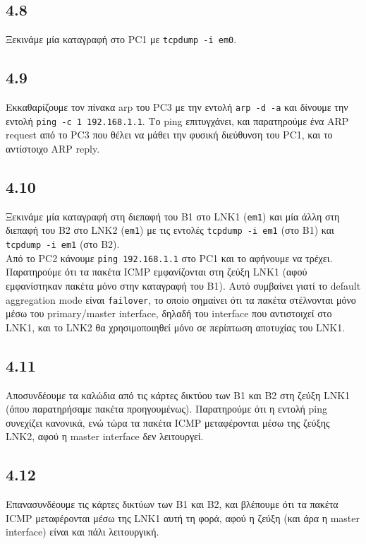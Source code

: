 \documentclass[a4paper, 12pt]{article}
\begin{document}
	\subsection*{4.8}
		Ξεκινάμε μία καταγραφή στο PC1 με \verb|tcpdump -i em0|.

	\subsection*{4.9}
		Εκκαθαρίζουμε τον πίνακα arp του PC3 με την εντολή \verb|arp -d -a| και δίνουμε την εντολή \verb|ping -c 1 192.168.1.1|. Το ping επιτυγχάνει, και παρατηρούμε ένα ARP request από το PC3 που θέλει να μάθει την φυσική διεύθυνση του PC1, και το αντίστοιχο ARP reply.

	\subsection*{4.10}
		Ξεκινάμε μία καταγραφή στη διεπαφή του B1 στο LNK1 (\verb|em1|) και μία άλλη στη διεπαφή του B2 στο LNK2 (\verb|em1|) με τις εντολές \verb|tcpdump -i em1| (στο B1) και \verb|tcpdump -i em1| (στο B2). \\
		
		Από το PC2 κάνουμε \verb|ping 192.168.1.1| στο PC1 και το αφήνουμε να τρέχει. Παρατηρούμε ότι τα πακέτα ICMP εμφανίζονται στη ζεύξη LNK1 (αφού εμφανίστηκαν πακέτα μόνο στην καταγραφή του B1). Αυτό συμβαίνει γιατί το default aggregation mode είναι \verb|failover|, το οποίο σημαίνει ότι τα πακέτα στέλνονται μόνο μέσω του primary/master interface, δηλαδή του interface που αντιστοιχεί στο LNK1, και το LNK2 θα χρησιμοποιηθεί μόνο σε περίπτωση αποτυχίας του LNK1.
		
	\subsection*{4.11}
		Αποσυνδέουμε τα καλώδια από τις κάρτες δικτύου των B1 και B2 στη ζεύξη LNK1 (όπου παρατηρήσαμε πακέτα προηγουμένως). Παρατηρούμε ότι η εντολή ping συνεχίζει κανονικά, ενώ τώρα τα πακέτα ICMP μεταφέρονται μέσω της ζεύξης LNK2, αφού η master interface δεν λειτουργεί.

	\subsection*{4.12}
		Επανασυνδέουμε τις κάρτες δικτύων των B1 και B2, και βλέπουμε ότι τα πακέτα ICMP μεταφέρονται μέσω της LNK1 αυτή τη φορά, αφού η ζεύξη (και άρα η master interface) είναι και πάλι λειτουργική.
\end{document}
